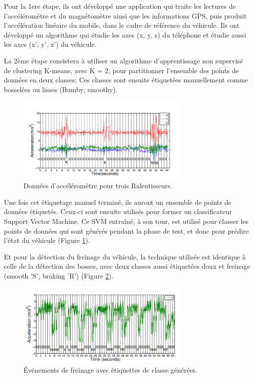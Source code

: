 Pour la 1ere étape, ils ont développé une application qui traite les lectures de l'accéléromètre et du magnétomètre ainsi que les informations GPS, puis produit l'accélération linéaire du mobile, dans le cadre de référence du véhicule. Ils ont développé un algorithme qui étudie les axes (x, y, z) du téléphone et étudie aussi les axes (x', y', z') du véhicule.

La 2ème étape consistera à utiliser un algorithme d'apprentissage non supervisé de clustering K-means, avec K = 2, pour partitionner l'ensemble des points de données en deux classes; Ces classes sont ensuite étiquetées manuellement comme bosselées ou lisses (Bumby; smoothy).

\begin{figure}[h!]
  \center
  \includegraphics[width=0.75\textwidth]{Images/chapter2/relatedWork1.PNG}
  \caption{Données d'accéléromètre pour trois Ralentisseurs.}
  \label{fig:wolverine_1}
\end{figure}

Une fois cet étiquetage manuel terminé, ils auront  un ensemble de points de données étiquetés. Ceux-ci sont ensuite utilisés pour former un classificateur Support Vector Machine. Ce SVM entraîné, à son tour, est utilisé pour classer les points de données qui sont générés pendant la phase de test, et donc pour prédire l'état du véhicule (Figure \ref{fig:wolverine_1}).

Et pour la détection du freinage du véhicule, la technique utilisée est identique à celle de la détection des bosses, avec deux classes aussi étiquetées doux et freinage (smooth 'S', braking 'R') (Figure \ref{fig:wolverine_2}).

\begin{figure}[h!]
  \center
  \includegraphics[width=0.75\textwidth]{Images/chapter2/relatedWork2.PNG}
  \caption{Événements de freinage avec étiquettes de classe générées.}
  \label{fig:wolverine_2}
\end{figure}

